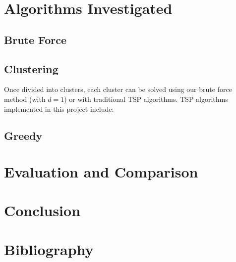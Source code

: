 \documentclass[a4paper,12pt]{article}
\begin{document}
    \pagebreak

    \section{Algorithms Investigated}\label{sec:algorithms-investigated}
    \subsection{Brute Force}\label{subsec:brute-force}

    \subsection{Clustering}\label{subsec:clustering}
    Once divided into clusters, each cluster can be solved using our brute force method (with \(d = 1\)) or with
    traditional TSP algorithms.
    TSP algorithms implemented in this project include:
    \subsection{Greedy}\label{subsec:greedy}

    \pagebreak
    
    \section{Evaluation and Comparison}\label{sec:evaluation-and-comparison}

    \pagebreak

    \section{Conclusion}\label{sec:conclusion}

    \pagebreak

    \section{Bibliography}\label{sec:bibliography}
\end{document}
